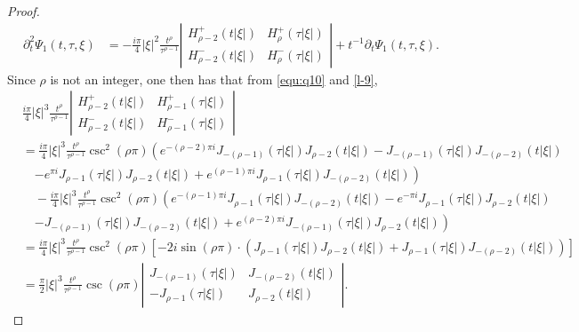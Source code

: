 \documentclass[11pt,twoside]{article}
\newcommand{\p}{\partial}
\theoremstyle{plain}
\theoremstyle{definition}
\theoremstyle{remark}
\numberwithin{equation}{section}
\begin{document}
\begin{proof}
\begin{equation}
\begin{aligned}
\partial_{t}^2 \Psi_{1}(t, \tau, \xi)
& =-\frac{i \pi}{4}|\xi|^2 \frac{t^{\rho}}{\tau^{\rho-1}}\left|\begin{array}{ll}
H_{\rho-2}^{+}(t|\xi|) & H_{\rho}^{+}(\tau|\xi|) \\
H_{\rho-2}^{-}(t|\xi|) & H_{\rho}^{-}(\tau|\xi|)
\end{array}\right|+ t^{-1}\p_t\Psi_{1}(t, \tau, \xi).
\end{aligned}
\end{equation}
Since $\rho$ is not an integer, one then has that from \eqref{equ:q10} and \eqref{l-9},
\begin{equation} \label{l-11}
\begin{aligned}
& \frac{i \pi}{4}|\xi|^3 \frac{t^{\rho}}{\tau^{\rho-1}}\left|\begin{array}{ll}
H_{\rho-2}^{+}(t|\xi|) & H_{\rho-1}^{+}(\tau|\xi|) \\
H_{\rho-2}^{-}(t|\xi|) & H_{\rho-1}^{-}(\tau|\xi|)
\end{array}\right|\\
& =\frac{i \pi}{4}|\xi|^3 \frac{t^{\rho}}{\tau^{\rho-1}} \csc ^{2}(\rho \pi)\left(e^{-(\rho-2) \pi i} J_{-(\rho-1)}(\tau|\xi|) J_{\rho-2}(t|\xi|)-J_{-(\rho-1)}(\tau|\xi|) J_{-(\rho-2)}(t|\xi|)\right. \\
& \quad\left.-e^{\pi i} J_{\rho-1}(\tau|\xi|) J_{\rho-2}(t|\xi|)+e^{(\rho-1) \pi i} J_{\rho-1}(\tau|\xi|) J_{-(\rho-2)}(t|\xi|)\right) \\
&\quad -\frac{i \pi}{4}|\xi|^3 \frac{t^{\rho}}{\tau^{\rho-1}} \csc ^{2}(\rho \pi)\left(e^{-(\rho-1) \pi i} J_{\rho-1}(\tau|\xi|) J_{-(\rho-2)}(t|\xi|)-e^{-\pi i} J_{\rho-1}(\tau|\xi|) J_{\rho-2}(t|\xi|)\right. \\
& \quad\left.-J_{-(\rho-1)}(\tau|\xi|) J_{-(\rho-2)}(t|\xi|)+e^{(\rho-2) \pi i} J_{-(\rho-1)}(\tau|\xi|) J_{\rho-2}(t|\xi|)\right) \\
& =\frac{i\pi}{4}|\xi|^3 \frac{t^{\rho}}{\tau^{\rho-1}} \csc ^2 (\rho \pi)\left[-2i\sin(\rho\pi)\cdot\left(J_{\rho-1}(\tau|\xi|)J_{\rho-2}(t|\xi|)+J_{\rho-1}(\tau|\xi|)J_{-(\rho-2)}(t|\xi|)\right)\right]\\
& =\frac{\pi}{2}|\xi|^3 \frac{t^{\rho}}{\tau^{\rho-1}} \csc  (\rho \pi)\left|\begin{array}{cc}
J_{-(\rho-1)}(\tau|\xi|) & J_{-(\rho-2)}(t|\xi|) \\
-J_{\rho-1}(\tau|\xi|) & J_{\rho-2}(t|\xi|)
\end{array}\right|.
\end{aligned}
\end{equation}

\end{proof}
\end{document}
